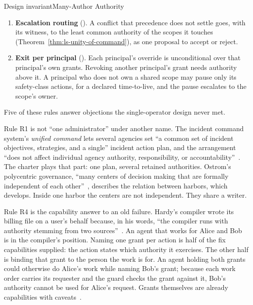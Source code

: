 \begin{pdclaim}{Design invariant}{Many-Author Authority}
\begin{enumerate}[leftmargin=2.2em,itemsep=2pt,label=R\arabic*.]
prevails, then the owner of the clashing scope. Within one principal, a later
direction supersedes an earlier one. Time alone never decides between two
principals.
\item \textbf{Escalation routing} (\Vision). A conflict that precedence does
not settle goes, with its witness, to the least common authority of the scopes
it touches (Theorem~\ref{thm:ls-unity-of-command}), as one proposal to accept
or reject.
\item \textbf{Exit per principal} (\Vision). Each principal's override is
unconditional over that principal's own grants. Revoking another principal's
grant needs authority above it. A principal who does not own a shared scope
may pause only its safety-class actions, for a declared time-to-live, and the
pause escalates to the scope's owner.
\end{enumerate}
\end{pdclaim}

\noindent Five of these rules answer objections the single-operator design
never met.

Rule R1 is not ``one administrator'' under another name. The incident command
system's \emph{unified command} lets several agencies set ``a common set of
incident objectives, strategies, and a single'' incident action plan, and the
arrangement ``does not affect individual agency authority, responsibility, or
accountability''~. The charter plays that part: one plan,
several retained authorities. Ostrom's polycentric governance, ``many centers
of decision making that are formally independent of each
other''~, describes the relation between harbors,
which  develops. Inside one harbor the
centers are not independent. They share a writer.

Rule R4 is the capability answer to an old failure. Hardy's compiler wrote its
billing file on a user's behalf because, in his words, ``the compiler runs with
authority stemming from two sources''~. An agent that
works for Alice and Bob is in the compiler's position. Naming one grant per
action is half of the fix capabilities supplied: the action states which
authority it exercises. The other half is binding that grant to the person the
work is for. An agent holding both grants could otherwise do Alice's work while
naming Bob's grant; because each work order carries its requester and the guard
checks the grant against it, Bob's authority cannot be used for Alice's
request. Grants
themselves are already capabilities with caveats~.


